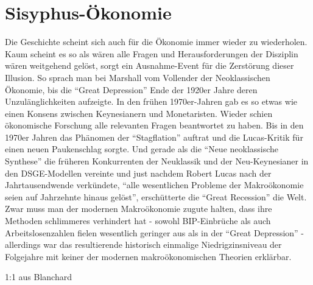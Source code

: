 %
%
%

\chapter{Sisyphus-Ökonomie}
\label{Gegenwart}

Die Geschichte scheint sich auch für die Ökonomie immer wieder zu wiederholen. Kaum scheint es so als wären alle Fragen und Herausforderungen der Disziplin wären weitgehend gelöst, sorgt ein Ausnahme-Event für die Zerstörung dieser Illusion. So sprach man bei Marshall vom Vollender der Neoklassischen Ökonomie, bis die "`Great Depression"' Ende der 1920er Jahre deren Unzulänglichkeiten aufzeigte. In den frühen 1970er-Jahren gab es so etwas wie einen Konsens zwischen Keynesianern und Monetaristen. Wieder schien ökonomische Forschung alle relevanten Fragen beantwortet zu haben. Bis in den 1970er Jahren das Phänomen der "`Stagflation"' auftrat und die Lucas-Kritik für einen neuen Paukenschlag sorgte. Und gerade als die "`Neue neoklassische Synthese"' die früheren Konkurrenten der Neuklassik und der Neu-Keynesianer in den DSGE-Modellen vereinte und just nachdem Robert Lucas nach der Jahrtausendwende verkündete, "`alle wesentlichen Probleme der Makroökonomie seien auf Jahrzehnte hinaus gelöst"', erschütterte die "`Great Recession"' die Welt. Zwar muss man der modernen Makroökonomie zugute halten, dass ihre Methoden schlimmeres verhindert hat - sowohl BIP-Einbrüche als auch Arbeitslosenzahlen fielen wesentlich geringer aus als in der "`Great Depression"' - allerdings war das resultierende historisch einmalige Niedrigzinsniveau der Folgejahre mit keiner der modernen makroökonomischen Theorien erklärbar.


1:1 aus Blanchard

